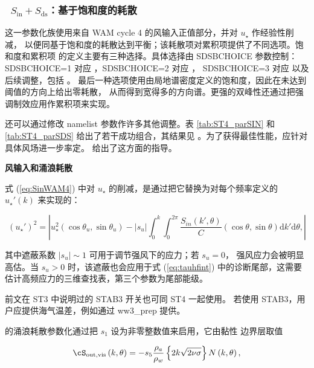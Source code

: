 \vsssub
\subsubsection{~$S_{\mathrm{in}} + S_{\mathrm{ds}}$：基于饱和度的耗散} \label{sec:ST4}
\vsssub


\noindent
这一参数化族使用来自 WAM cycle 4 的风输入正值部分，并对 $u_\star$ 作经验性削减，
以便同基于饱和度的耗散达到平衡；该耗散项对累积项提供了不同选项。饱和度和累积项
的定义主要有三种选择。具体选择由 {\F SDSBCHOICE} 参数控制：{\F SDSBCHOICE=1}
对应 \cite{art:Aea10}，{\F SDSBCHOICE=2} 对应 \cite{Filipot&Ardhuin2012}，
{\F SDSBCHOICE=3} 对应 \cite{Romero2019} 以及后续调整，包括 \cite{art:AA23}。
最后一种选项使用由局地谱密度定义的饱和度，因此在未达到阈值的方向上给出零耗散，
从而得到宽得多的方向谱。更强的双峰性还通过把强调制效应用作累积项来实现。

还可以通过修改 namelist 参数作许多其他调整。表 \ref{tab:ST4_parSIN} 和
\ref{tab:ST4_parSDS} 给出了若干成功组合，其结果见
\citep{art:RA13,art:SAG16,art:AA23}。为了获得最佳性能，应针对具体风场进一步率定。
\cite{Stopa2018} 给出了这方面的指导。

\vsssub
\textbf{风输入和涌浪耗散}
\vsssub

式 (\ref{eq:SinWAM4}) 中对 $u_\star$ 的削减，是通过把它替换为对每个频率定义的
$u_\star '(k)$ 来实现的：

\begin{equation}
\left(u_\star '\right)^2=\left|u_\star^2 \left(\cos \theta_u, \sin
\theta_u \right) - \left|s_u\right| \int_0^k \int_0^{2 \pi}
\frac{S_{in}\left(k',\theta \right)}{C}  \left(\cos \theta, \sin
\theta \right)  {\mathrm d} k' \mathrm d
\theta,\label{ustarp}\right|
\end{equation}

\noindent
其中遮蔽系数 $\left|s_u\right|\sim 1$ 可用于调节强风下的应力；若 $s_u=0$，
强风应力会被明显高估。当 $s_u > 0$ 时，该遮蔽也会应用于式 (\ref{eq:tauhfint})
中的诊断尾部，这需要估计高频应力的三维查找表，第三个参数为尾部能级。

前文在 {\code ST3} 中说明过的 {\code STAB3} 开关也可同 {\code ST4} 一起使用。
若使用 {\code STAB3}，用户应提供海气温差，例如通过 {\file ww3\_prep} 提供。

\cite{art:ACC09} 的涌浪耗散参数化通过把 $s_1$ 设为非零整数值来启用，它由黏性
边界层取值

\begin{equation}
\cS_{\mathrm{out,vis}}\left(k,\theta\right) = - s_5 \frac{\rho_a}{\rho_w}\left\{ 2 k \sqrt{2
\nu \sigma}\right\}  N \left(k,\theta\right) , \label{eq:Dore}
\end{equation}

